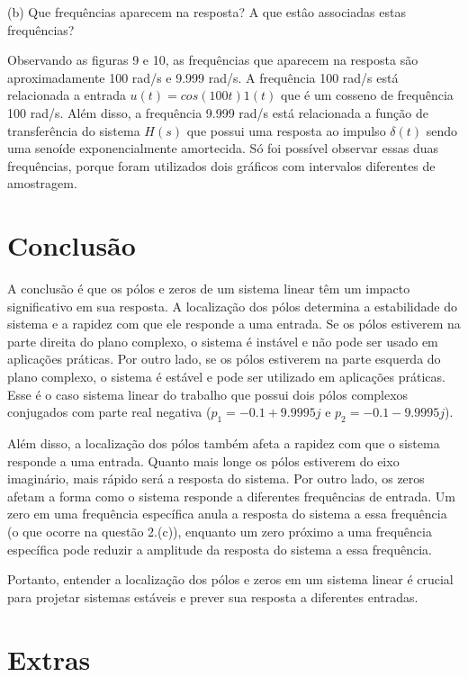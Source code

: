 \documentclass[10pt]{article}
\begin{document}
(b) Que frequências aparecem na resposta? A que estâo associadas estas frequências?

\quad Observando as figuras 9 e 10, as frequências que aparecem na resposta são aproximadamente 100 rad/s e 9.999 rad/s.
A frequência 100 rad/s está relacionada a entrada $u(t) = cos(100t) 1(t)$ que é um cosseno de frequência 100 rad/s.
Além disso, a frequência 9.999 rad/s está relacionada a função de transferência do sistema $H(s)$
que possui uma resposta ao impulso $\delta(t)$ sendo uma senoíde exponencialmente amortecida.
Só foi possível observar essas duas frequências,
porque foram utilizados dois gráficos com intervalos diferentes de amostragem.


\newpage

\section{Conclusão}

\quad A conclusão é que os pólos e zeros de um sistema linear têm um impacto significativo em sua resposta.
A localização dos pólos determina a estabilidade do sistema e a rapidez com que ele responde a uma entrada.
Se os pólos estiverem na parte direita do plano complexo, o sistema é instável e não pode ser usado em aplicações práticas.
Por outro lado, se os pólos estiverem na parte esquerda do plano complexo, o sistema é estável e pode ser utilizado em aplicações práticas.
Esse é o caso sistema linear do trabalho que possui dois pólos complexos conjugados com parte real negativa ($p_1 = -0.1 + 9.9995j$ e $p_2 = -0.1 - 9.9995j$).

\quad Além disso, a localização dos pólos também afeta a rapidez com que o sistema responde a uma entrada.
Quanto mais longe os pólos estiverem do eixo imaginário, mais rápido será a resposta do sistema. Por outro lado,
os zeros afetam a forma como o sistema responde a diferentes frequências de entrada.
Um zero em uma frequência específica anula a resposta do sistema a essa frequência
(o que ocorre na questão 2.(c)),
enquanto um zero próximo a uma frequência específica pode reduzir a amplitude da resposta do sistema a essa frequência.

\quad Portanto, entender a localização dos pólos e zeros em um sistema linear é crucial para projetar sistemas estáveis e prever sua resposta a diferentes entradas.
\newpage

\section{Extras}
\end{document}
